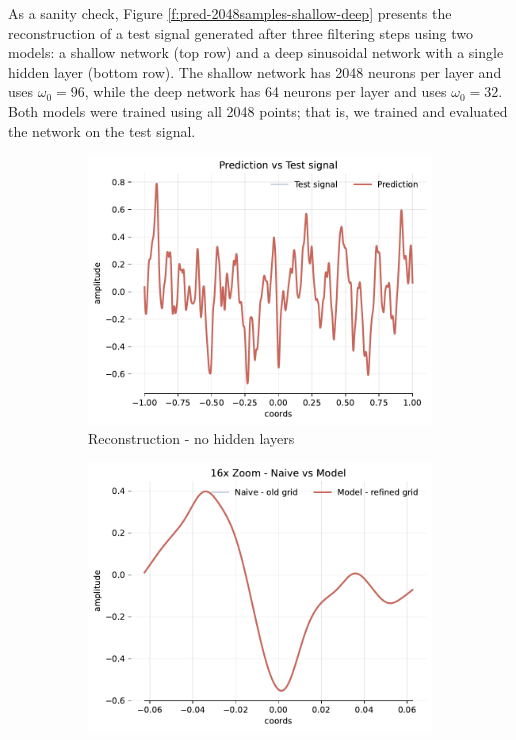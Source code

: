 As a sanity check, Figure \ref{f:pred-2048samples-shallow-deep} presents the reconstruction of a test signal generated after three filtering steps using two models: a shallow network (top row) and a deep sinusoidal network with a single hidden layer (bottom row). The shallow network has 2048 neurons per layer and uses \(\omega_0 = 96\), while the deep network has 64 neurons per layer and uses \(\omega_0 = 32\). Both models were trained using all 2048 points; that is, we trained and evaluated the network on the test signal. 

\begin{figure}[!h]
    \centering
    \begin{subfigure}[b]{0.32\textwidth}
        \centering
        \includegraphics[width=\textwidth]{img/ch3/pred-2048hf-0hl-96w-filter3.pdf}
        \caption{Reconstruction - no hidden layers}
    \end{subfigure}
    \begin{subfigure}[b]{0.32\textwidth}
        \centering
        \includegraphics[width=\textwidth]{img/ch3/16x-2048hf-0hl-96w-filter3.pdf}

\end{subfigure}
\end{figure}
